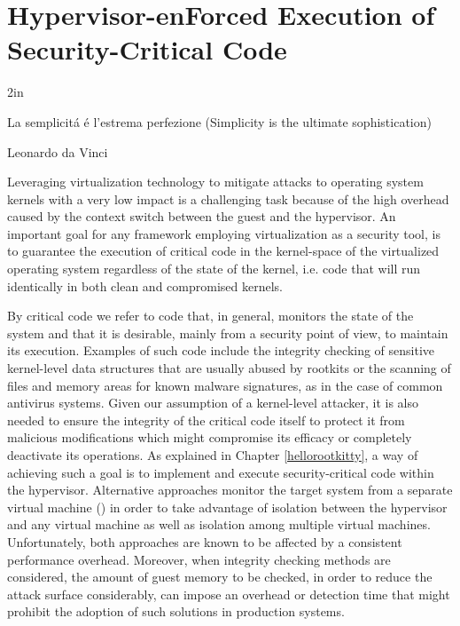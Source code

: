 \newcommand{\HRK}{\emph{Hello rootKitty}}

\chapter{Hypervisor-enForced Execution of Security-Critical Code}\label{hyperforce}

\epigraph{2in}{La semplicit\'a \'e l'estrema perfezione (Simplicity is the ultimate sophistication)}{Leonardo da Vinci}{}




Leveraging virtualization technology to mitigate attacks to operating system kernels with a very low impact is a challenging task because of the high overhead caused by the context switch between the guest and the hypervisor. An important goal for any framework employing virtualization as a security tool, is to guarantee the execution of critical code in the kernel-space of the virtualized operating system regardless of the state of the kernel, i.e. code that will run identically in both clean and compromised kernels.

By critical code we refer to code that, in general, monitors the state of the system and that it is desirable, mainly from a security point of view, to maintain its execution. Examples of such code include the integrity checking of sensitive kernel-level data structures that are usually abused by rootkits or the scanning of files and memory areas for known malware signatures, as in the case of common antivirus systems. 
Given our assumption of a kernel-level attacker, it is also needed to ensure the integrity of the critical code itself to protect it from malicious modifications which might compromise its efficacy or completely deactivate its operations.
As explained in Chapter \ref{hellorootkitty}, a way of achieving such a goal is to implement and execute security-critical code within the hypervisor. Alternative approaches monitor the target system from a separate virtual machine (\cite{lares, outvm, livewire}) in order to take advantage of isolation between the hypervisor and any virtual machine as well as isolation among multiple virtual machines.
Unfortunately, both approaches are known to be affected by a consistent performance overhead. Moreover, when integrity checking methods are considered, the amount of guest memory to be checked, in order to reduce the attack surface considerably, can impose an overhead or detection time that might prohibit the adoption of such solutions in production systems. 

